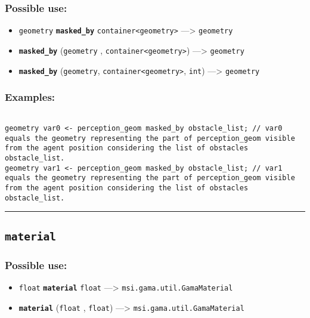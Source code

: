 \documentclass[]{book}
\providecommand{\tightlist}{%
  \setlength{\itemsep}{0pt}\setlength{\parskip}{0pt}}
\theoremstyle{definition}
\theoremstyle{definition}
\theoremstyle{definition}
\theoremstyle{remark}
\begin{document}
\subsubsection{Possible use:}\label{possible-use-334}

\begin{itemize}
\tightlist
\item
  \texttt{geometry} \textbf{\texttt{masked\_by}}
  \texttt{container\textless{}geometry\textgreater{}} ---\textgreater{}
  \texttt{geometry}
\item
  \textbf{\texttt{masked\_by}} (\texttt{geometry} ,
  \texttt{container\textless{}geometry\textgreater{}}) ---\textgreater{}
  \texttt{geometry}
\item
  \textbf{\texttt{masked\_by}} (\texttt{geometry},
  \texttt{container\textless{}geometry\textgreater{}}, \texttt{int})
  ---\textgreater{} \texttt{geometry}
\end{itemize}

\subsubsection{Examples:}\label{examples-231}

\begin{verbatim}
 
geometry var0 <- perception_geom masked_by obstacle_list; // var0 equals the geometry representing the part of perception_geom visible from the agent position considering the list of obstacles obstacle_list. 
geometry var1 <- perception_geom masked_by obstacle_list; // var1 equals the geometry representing the part of perception_geom visible from the agent position considering the list of obstacles obstacle_list.
\end{verbatim}

\begin{center}\rule{0.5\linewidth}{\linethickness}\end{center}

\subsection{\texorpdfstring{\texttt{material}}{material}}\label{material}

\subsubsection{Possible use:}\label{possible-use-335}

\begin{itemize}
\tightlist
\item
  \texttt{float} \textbf{\texttt{material}} \texttt{float}
  ---\textgreater{} \texttt{msi.gama.util.GamaMaterial}
\item
  \textbf{\texttt{material}} (\texttt{float} , \texttt{float})
  ---\textgreater{} \texttt{msi.gama.util.GamaMaterial}
\end{itemize}
\end{document}
